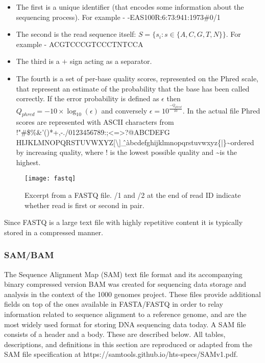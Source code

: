 \begin{itemize}
    \item The first is a unique identifier (that encodes some information about the sequencing process). For example - \@HWUSI-EAS100R:6:73:941:1973\#0/1
    \item The second is the read sequence itself: $S = \{s_i: s \in\{A,C,G,T,N\}\}$. For example - ACGTCCCGTCCCTNTCCA
    \item The third is a $+$ sign acting as a separator.
    \item The fourth is a set of per-base quality scores, represented on the Phred scale, that represent an estimate of the probability that the base has been called correctly. If the error probability is defined as $\epsilon$ then $Q_{phred} = -10\times\log_{10}(\epsilon)$ and conversely $\epsilon = 10^{\frac{-Q_{phred}}{10}}$. In the actual file Phred scores are represented with ASCII characters from !"\#\$\%\&'()*+,-./0123456789:;<=>?@ABCDEFG HIJKLMNOPQRSTUVWXYZ[\textbackslash]\^\_\`abcdefghijklmnopqrstuvwxyz\{|\}\textasciitilde ordered by increasing quality, where ! is the lowest possible quality and \textasciitilde is the highest.
\end{itemize}

\begin{figure}[H]
    \texttt{[image: fastq]}
    \centering
    \caption {Excerpt from a FASTQ file. /1 and /2 at the end of read ID indicate whether read is first or second in pair.}
    \label{fig:fastq}
\end{figure}

Since FASTQ is a large text file with highly repetitive content it is typically stored in a compressed manner.

\subsubsection{SAM/BAM}

The Sequence Alignment Map (SAM) text file format and its accompanying binary compressed version BAM was created for sequencing data storage and analysis in the context of the 1000 genomes project\autocite{li2009sequence}. These files provide additional fields on top of the ones available in FASTA/FASTQ in order to relay information related to sequence alignment to a reference genome, and are the most widely used format for storing DNA sequencing data today. A SAM file consists of a header and a body. These are described below. All tables, descriptions, and definitions in this section are reproduced or adapted from the SAM file specification at https://samtools.github.io/hts-specs/SAMv1.pdf.

